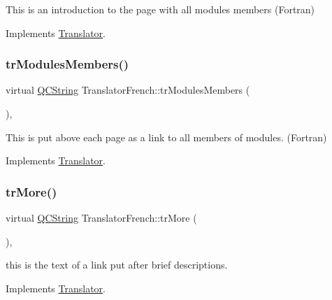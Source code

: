 This is an introduction to the page with all modules members (Fortran) 

Implements \mbox{\hyperlink{class_translator}{Translator}}.

\mbox{\label{class_translator_french_ab1447c21588b36915ee511f911102924}} 
\subsubsection{\texorpdfstring{trModulesMembers()}{trModulesMembers()}}
{\footnotesize\ttfamily virtual \mbox{\hyperlink{class_q_c_string}{Q\+C\+String}} Translator\+French\+::tr\+Modules\+Members (\begin{DoxyParamCaption}{ }\end{DoxyParamCaption})\hspace{0.3cm}{\ttfamily [inline]}, {\ttfamily [virtual]}}

This is put above each page as a link to all members of modules. (Fortran) 

Implements \mbox{\hyperlink{class_translator}{Translator}}.

\mbox{\label{class_translator_french_a78bb123dd03b2fb741b37f13ae4ffa62}} 
\subsubsection{\texorpdfstring{trMore()}{trMore()}}
{\footnotesize\ttfamily virtual \mbox{\hyperlink{class_q_c_string}{Q\+C\+String}} Translator\+French\+::tr\+More (\begin{DoxyParamCaption}{ }\end{DoxyParamCaption})\hspace{0.3cm}{\ttfamily [inline]}, {\ttfamily [virtual]}}

this is the text of a link put after brief descriptions. 

Implements \mbox{\hyperlink{class_translator}{Translator}}.

\mbox{\label{class_translator_french_a6e6d1a3b581985652b0a8d05783f540e}} 
